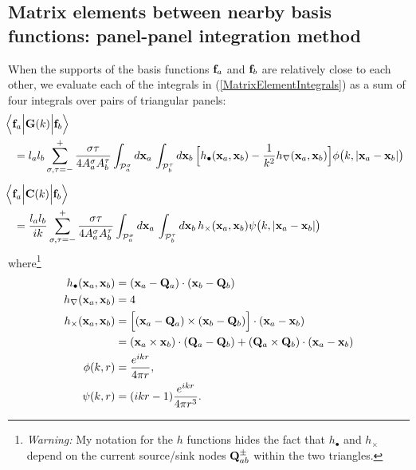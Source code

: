 \documentclass[letterpaper]{article}
\begin{document}

\subsection{Matrix elements between nearby basis functions: 
            panel-panel integration method}

When the supports of the basis functions $\mathbf{f}_a$ and $\mathbf{f}_b$ 
are relatively close to each other, we evaluate each of the 
integrals in (\ref{MatrixElementIntegrals}) as a sum of four
integrals over pairs of triangular panels: 
\begin{subequations}
\begin{align}
&\hspace{-0.1in}
 \Big\langle \vb f_a \Big| \vb G(k) \Big | \vb f_b \Big \rangle
\nn
&=
  l_a l_b 
  \sum_{\sigma, \tau=-}^+ 
  \frac{\sigma\tau}{4A^\sigma_a A^\tau_b}
  \int_{\pan_a^\sigma}  d\vb x_a \,
  \int_{\pan_b^\tau}  d\vb x_b \,
   \Big[                 h_{\bullet}(\vb x_a, \vb x_b)
         - \frac{1}{k^2} h_{\nabla}(\vb x_a, \vb x_b)
   \Big]
   \phi\big(k, |\vb x_a - \vb x_b|\big)
\\[5pt]
&\hspace{-0.1in}
 \Big\langle \vb f_a \Big| \vb C(k) \Big | \vb f_b \Big \rangle
\nn
&=
  \frac{l_a l_b}{ik}
  \sum_{\sigma, \tau=-}^+ 
  \frac{\sigma \tau}{4A^\sigma_a A^\tau_b}
  \int_{\pan_a^\sigma}  d\vb x_a \,
  \int_{\pan_b^\tau}  d\vb x_b \,
   h_{\times}(\vb x_a, \vb x_b)
   \psi\big(k, |\vb x_a - \vb x_b|\big)
\end{align}
\label{PanelPanelIntegrals}
\end{subequations}
where\footnote{\textit{Warning:} My notation for the $h$ functions
hides the fact that $h_\bullet$ and $h_\times$ depend on the current 
source/sink nodes $\mathbf{Q}_{ab}^\pm$ within the two triangles.}
\begin{align*}
h_{\bullet}(\mathbf{x}_a, \mathbf{x}_b)
&= (\mathbf{x}_a - \mathbf{Q}_a) \cdot (\mathbf{x}_b - \mathbf{Q}_b) 
\\
h_{\nabla}(\mathbf{x}_a, \mathbf{x}_b)
&= 4
\\
h_{\times}(\mathbf{x}_a, \mathbf{x}_b)
&=
\Big[ (\mathbf{x}_a - \mathbf{Q}_a) \times (\mathbf{x}_b - \mathbf{Q}_b) \Big]
      \cdot (\mathbf{x}_a - \mathbf{x}_b)
\\
&=
      (\mathbf{x}_a \times \mathbf{x}_b) \cdot (\mathbf{Q}_a - \mathbf{Q}_b)
    + (\mathbf{Q}_a \times \mathbf{Q}_b) \cdot (\mathbf{x}_a - \mathbf{x}_b)
\\
\phi(k, r)&=\frac{e^{ikr}}{4\pi r}, 
\\
\psi(k, r)&=(ikr-1)\frac{e^{ikr}}{4\pi r^3}.
\end{align*}
\end{document}
